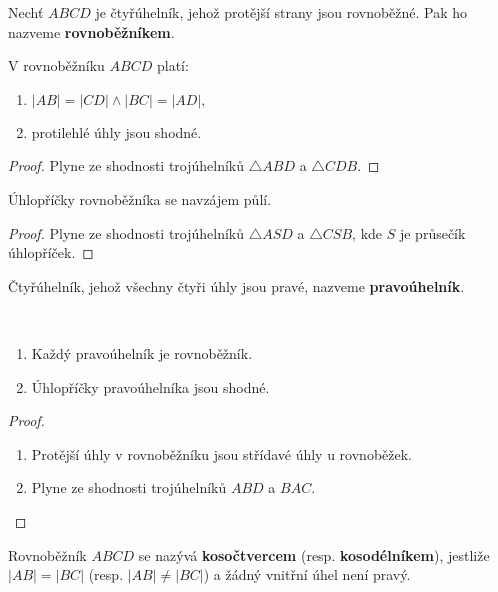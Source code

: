 \begin{definition}
  Nechť $ABCD$ je čtyřúhelník, jehož protější strany jsou rovnoběžné. Pak ho nazveme \textbf{rovnoběžníkem}.
\end{definition}

\begin{veta}
  V rovnoběžníku $ABCD$ platí:
  \begin{enumerate}[$i.$]
    \item $|AB|=|CD| \land |BC|=|AD|,$
    \item protilehlé úhly jsou shodné.
  \end{enumerate}
\end{veta}

\begin{proof}
  Plyne ze shodnosti trojúhelníků $\triangle ABD$ a $\triangle CDB.$
\end{proof}

\begin{veta}
  Úhlopříčky rovnoběžníka se navzájem půlí.
\end{veta}


\begin{proof}
  Plyne ze shodnosti trojúhelníků $\triangle ASD$ a $\triangle CSB$, kde $S$ je průsečík úhlopříček.
\end{proof}

\begin{definition}
  Čtyřúhelník, jehož všechny čtyři úhly jsou pravé, nazveme \textbf{pravoúhelník}.
\end{definition}

\begin{veta}\,
  \begin{enumerate}[$i.$]
    \item Každý pravoúhelník je rovnoběžník.
    \item Úhlopříčky pravoúhelníka jsou shodné.
  \end{enumerate}
\end{veta}

\begin{proof}\,
  \begin{enumerate}[$i.$]
    \item Protější úhly v rovnoběžníku jsou střídavé úhly u rovnoběžek.
    \item Plyne ze shodnosti trojúhelníků $ABD$ a $BAC$.\qedhere
  \end{enumerate}
\end{proof}

\begin{definition}
  Rovnoběžník $ABCD$ se nazývá \textbf{kosočtvercem} (resp. \textbf{kosodélníkem}), jestliže $|AB|=|BC|$ (resp. $|AB| \neq |BC|$) a žádný vnitřní úhel není pravý.
\end{definition}


